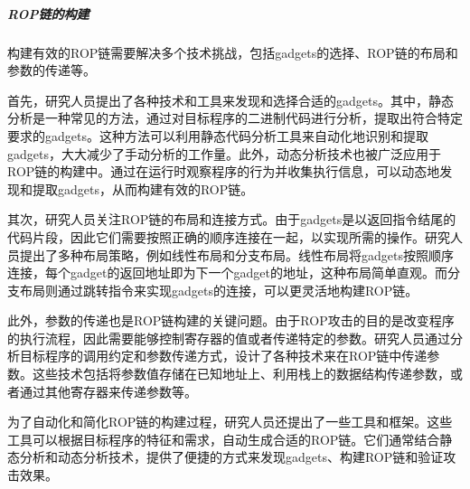 \documentclass[UTF8,12pt,a4paper]{ctexart}
\numberwithin{figure}{section}
\begin{document}
\subparagraph{ROP链的构建}
\par 构建有效的ROP链需要解决多个技术挑战，包括gadgets的选择、ROP链的布局和参数的传递等。
\par 首先，研究人员提出了各种技术和工具来发现和选择合适的gadgets。其中，静态分析是一种常见的方法，通过对目标程序的二进制代码进行分析，提取出符合特定要求的gadgets。这种方法可以利用静态代码分析工具来自动化地识别和提取gadgets，大大减少了手动分析的工作量。此外，动态分析技术也被广泛应用于ROP链的构建中。通过在运行时观察程序的行为并收集执行信息，可以动态地发现和提取gadgets，从而构建有效的ROP链。
\par 其次，研究人员关注ROP链的布局和连接方式。由于gadgets是以返回指令结尾的代码片段，因此它们需要按照正确的顺序连接在一起，以实现所需的操作。研究人员提出了多种布局策略，例如线性布局和分支布局。线性布局将gadgets按照顺序连接，每个gadget的返回地址即为下一个gadget的地址，这种布局简单直观。而分支布局则通过跳转指令来实现gadgets的连接，可以更灵活地构建ROP链。
\par 此外，参数的传递也是ROP链构建的关键问题。由于ROP攻击的目的是改变程序的执行流程，因此需要能够控制寄存器的值或者传递特定的参数。研究人员通过分析目标程序的调用约定和参数传递方式，设计了各种技术来在ROP链中传递参数。这些技术包括将参数值存储在已知地址上、利用栈上的数据结构传递参数，或者通过其他寄存器来传递参数等。
\par 为了自动化和简化ROP链的构建过程，研究人员还提出了一些工具和框架。这些工具可以根据目标程序的特征和需求，自动生成合适的ROP链。它们通常结合静态分析和动态分析技术，提供了便捷的方式来发现gadgets、构建ROP链和验证攻击效果。
\end{document}
